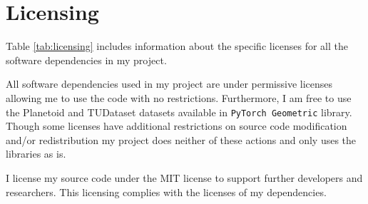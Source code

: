 \section{Licensing}



Table \ref{tab:licensing} includes information about the specific licenses for all the software dependencies in my project.

All software dependencies used in my project are under permissive licenses allowing me to use the code with no restrictions.
Furthermore, I am free to use the Planetoid  and TUDataset \cite{Morris+2020} datasets available in \texttt{PyTorch Geometric} library.
Though some licenses have additional restrictions on source code modification and/or redistribution my project does neither of these actions and only uses the libraries as is.

I license my source code under the MIT license to support further developers and researchers.
This licensing complies with the licenses of my dependencies.

